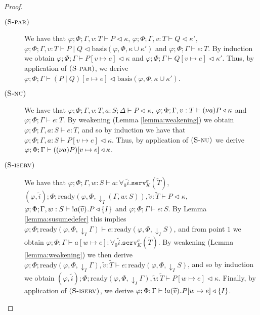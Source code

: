 \begin{lemma}[Substitution]
\begin{proof}
\begin{enumerate}
\begin{description}
%
\item[$\mbox{\textsc{\protect{(S-par})}}$] We have that $\varphi;\Phi;\Gamma,v:T\vdash P \triangleleft \kappa$, $\varphi;\Phi;\Gamma,v:T\vdash Q \triangleleft \kappa'$, $\varphi;\Phi;\Gamma,v:T\vdash P \mid Q \triangleleft \text{basis}(\varphi,\Phi,\kappa\cup\kappa')$ and $\varphi;\Phi;\Gamma\vdash e : T$. By induction we obtain $\varphi;\Phi;\Gamma\vdash P[v\mapsto e] \triangleleft \kappa$ and $\varphi;\Phi;\Gamma\vdash Q[v\mapsto e] \triangleleft \kappa'$. Thus, by application of $\mbox{\textsc{\protect{(S-par})}}$, we derive $\varphi;\Phi;\Gamma\vdash (P \mid Q)[v\mapsto e] \triangleleft \text{basis}(\varphi,\Phi,\kappa\cup\kappa')$.
%
\item[$\mbox{\textsc{\protect{(S-nu})}}$] We have that $\varphi;\Phi;\Gamma,v:T,a:S;\Delta\vdash P \triangleleft \kappa$, $\varphi;\Phi;\Gamma,v:T\vdash (\nu a) P \triangleleft \kappa$ and $\varphi;\Phi;\Gamma\vdash e : T$. By weakening (Lemma \ref{lemma:weakening}) we obtain $\varphi;\Phi;\Gamma,a:S\vdash e : T$, and so by induction we have that $\varphi;\Phi;\Gamma,a:S\vdash P[v\mapsto e] \triangleleft \kappa$. Thus, by application of $\mbox{\textsc{\protect{(S-nu})}}$ we derive $\varphi;\Phi;\Gamma\vdash ((\nu a) P)[v\mapsto e] \triangleleft \kappa$.
%
\item[$\mbox{\textsc{\protect{(S-iserv})}}$] We have that $\varphi;\Phi;\Gamma,w:S\vdash a : \forall_0\widetilde{i}.\texttt{serv}^\sigma_K(\widetilde{T})$, $(\varphi,\widetilde{i});\Phi;\text{ready}(\varphi,\Phi,\downarrow_I\!\!(\Gamma,w:S)),\widetilde{v}:\widetilde{T}\vdash P \triangleleft \kappa$, $\varphi;\Phi;\Gamma,w:S\vdash\; !a(\widetilde{v})^{}.P \triangleleft \{I\}$ and $\varphi;\Phi;\Gamma\vdash e : S$. By Lemma \ref{lemma:susumedefer} this implies $\varphi;\Phi;\text{ready}(\varphi,\Phi,\downarrow_I\!\!\Gamma)\vdash e : \text{ready}(\varphi,\Phi,\downarrow_I\!\!S)$, and from point $1$ we obtain $\varphi;\Phi;\Gamma\vdash a[w\mapsto e] : \forall_0\widetilde{i}.\texttt{serv}^\sigma_K(\widetilde{T})$. By weakening (Lemma \ref{lemma:weakening}) we then derive $\varphi;\Phi;\text{ready}(\varphi,\Phi,\downarrow_I\!\!\Gamma),\widetilde{v}:\widetilde{T}\vdash e : \text{ready}(\varphi,\Phi,\downarrow_I\!\!S)$, and so by induction we obtain $(\varphi,\widetilde{i});\Phi;\text{ready}(\varphi,\Phi,\downarrow_I\!\!\Gamma),\widetilde{v}:\widetilde{T}\vdash P[w\mapsto e] \triangleleft \kappa$. Finally, by application of $\mbox{\textsc{\protect{(S-iserv})}}$, we derive $\varphi;\Phi;\Gamma\vdash\; !a(\widetilde{v})^{}.P[w\mapsto e] \triangleleft \{I\}$.
%

\end{description}
\end{enumerate}
\end{proof}
\end{lemma}
